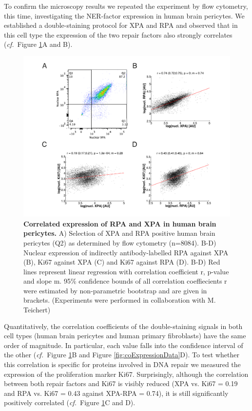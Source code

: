 To confirm the microscopy results we repeated the experiment by flow cytometry, this time, investigating the NER-factor expression in human brain pericytes. We established a double-staining protocol for XPA and RPA and observed that in this cell type the expression of the two repair factors also strongly correlates (\textit{cf.}\ Figure \ref{fig:FC_correlation}A and B).    
\begin{figure}[t]
	\begin{center}
		\includegraphics[width=1\textwidth]{Abbildungen/figureTAC_3.pdf}
		\caption{\textbf{Correlated expression of RPA and XPA in human brain pericytes.} A) Selection of XPA and RPA positive human brain pericytes (Q2) as determined by flow cytometry (n=8084). B-D) Nuclear expression of indirectly antibody-labelled RPA against XPA (B), Ki67 against XPA (C) and Ki67 against RPA (D). B-D) Red lines represent linear regression with correlation coefficient r, p-value and slope m. 95\% confidence bounds of all correlation coeffiecients r were estimated by non-parametric bootstrap and are given in brackets. (Experiments were performed in collaboration with M. Teichert)}
		\label{fig:FC_correlation}
	\end{center}
\end{figure}
Quantitatively, the correlation coefficients of the double-staining signals in both cell types (human brain pericytes and human primary fibroblasts) have the same order of magnitude. In particular, each value falls into the confidence interval of the other (\textit{cf.}\ Figure \ref{fig:FC_correlation}B and Figure \ref{fig:coExpressionData}D). To test whether this correlation is specific for proteins involved in DNA repair we measured the expression of the proliferation marker Ki67. Surprisingly, although the correlation between both repair factors and Ki67 is visibly reduced (XPA vs. Ki67 = 0.19 and RPA vs. Ki67 = 0.43 against XPA-RPA = 0.74), it is still significantly positively correlated (\textit{cf.}\ Figure \ref{fig:FC_correlation}C and D).\\
